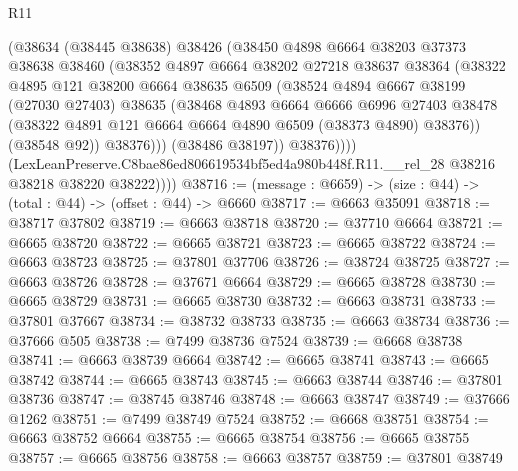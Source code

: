 \begin{lexlean}{R11}
\begin{coremodule}
                  (@38634
                    (@38445 @38638)
                    @38426
                    (@38450
                      @4898
                      @6664
                      @38203
                      @37373
                      @38638
                      @38460
                      (@38352
                        @4897
                        @6664
                        @38202
                        @27218
                        @38637
                        @38364
                        (@38322
                          @4895
                          @121
                          @38200
                          @6664
                          @38635
                          @6509
                          (@38524
                            @4894
                            @6667
                            @38199
                            (@27030 @27403)
                            @38635
                            (@38468
                              @4893
                              @6664
                              @6666
                              @6996
                              @27403
                              @38478
                              (@38322 @4891 @121 @6664 @6664 @4890 @6509 (@38373 @4890) @38376))
                            (@38548 @92))
                          @38376)))
                    (@38486 @38197))
                  @38376))))
          (LexLeanPreserve.C8bae86ed806619534bf5ed4a980b448f.R11.__rel_28
            @38216
            @38218
            @38220
            @38222))))
@38716 := (message : @6659) -> (size : @44) -> (total : @44) -> (offset : @44) -> @6660
@38717 := @6663 @35091
@38718 := @38717 @37802
@38719 := @6663 @38718
@38720 := @37710 @6664
@38721 := @6665 @38720
@38722 := @6665 @38721
@38723 := @6665 @38722
@38724 := @6663 @38723
@38725 := @37801 @37706
@38726 := @38724 @38725
@38727 := @6663 @38726
@38728 := @37671 @6664
@38729 := @6665 @38728
@38730 := @6665 @38729
@38731 := @6665 @38730
@38732 := @6663 @38731
@38733 := @37801 @37667
@38734 := @38732 @38733
@38735 := @6663 @38734
@38736 := @37666 @505
@38738 := @7499 @38736 @7524
@38739 := @6668 @38738
@38741 := @6663 @38739 @6664
@38742 := @6665 @38741
@38743 := @6665 @38742
@38744 := @6665 @38743
@38745 := @6663 @38744
@38746 := @37801 @38736
@38747 := @38745 @38746
@38748 := @6663 @38747
@38749 := @37666 @1262
@38751 := @7499 @38749 @7524
@38752 := @6668 @38751
@38754 := @6663 @38752 @6664
@38755 := @6665 @38754
@38756 := @6665 @38755
@38757 := @6665 @38756
@38758 := @6663 @38757
@38759 := @37801 @38749

\end{coremodule}
\end{lexlean}

